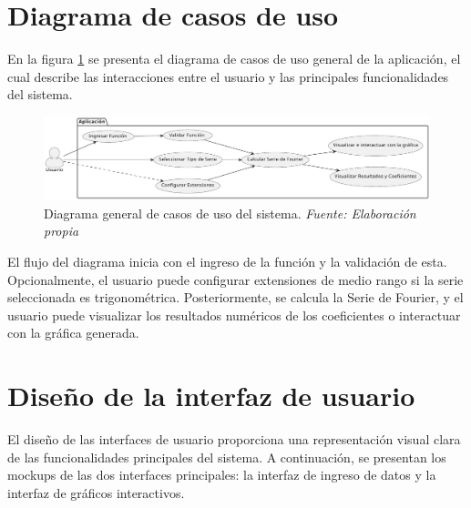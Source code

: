 \newpage

\section{Diagrama de casos de uso}
En la figura \ref{fig:Diagrama_casos_de_uso} se presenta el diagrama de casos de uso general de la aplicación, el cual describe las interacciones entre el usuario y las principales funcionalidades del sistema. 
\begin{figure}[H]
	\centering
	\includegraphics[width=1\textwidth]{img/chapter04/DCU.pdf}
	\caption[Diagrama general de casos de uso del sistema.]{Diagrama general de casos de uso del sistema. \textit{Fuente: \textit{Elaboración propia}}}
	\label{fig:Diagrama_casos_de_uso}
\end{figure}
El flujo del diagrama inicia con el ingreso de la función y la validación de esta. Opcionalmente, el usuario puede configurar extensiones de medio rango si la serie seleccionada es trigonométrica. Posteriormente, se calcula la Serie de Fourier, y el usuario puede visualizar los resultados numéricos de los coeficientes o interactuar con la gráfica generada.

\section{Diseño de la interfaz de usuario}
El diseño de las interfaces de usuario proporciona una representación visual clara de las funcionalidades principales del sistema. A continuación, se presentan los mockups de las dos interfaces principales: la interfaz de ingreso de datos y la interfaz de gráficos interactivos.
